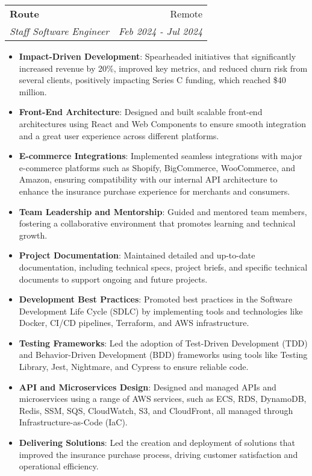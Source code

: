 \documentclass[letterpaper,11pt]{article}
\makeatletter
\newcommand{\resumeItem}[2]{
  \item\small{
    \textbf{#1}{: #2 \vspace{-2pt}}
  }
}
\newcommand{\resumeSubheading}[4]{
  \vspace{-1pt}\item
    \begin{tabular*}{0.97\textwidth}[t]{l@{\extracolsep{\fill}}r}
      \textbf{#1} & #2 \\
      \textit{\small#3} & \textit{\small #4} \\
    \end{tabular*}\vspace{-5pt}
}
\newcommand{\resumeItemListStart}{\begin{itemize}}
\newcommand{\resumeItemListEnd}{\end{itemize}\vspace{-5pt}}
\makeatother
\begin{document}
\resumeSubheading
      {Route}{Remote}
      {Staff Software Engineer}{Feb 2024 - Jul 2024}
      \resumeItemListStart
        \resumeItem{Impact-Driven Development}
          {Spearheaded initiatives that significantly increased revenue by 20\%, improved key metrics, and reduced churn risk from several clients, positively impacting Series C funding, which reached \$40 million.}
        \resumeItem{Front-End Architecture}
          {Designed and built scalable front-end architectures using React and Web Components to ensure smooth integration and a great user experience across different platforms.}
 \resumeItem{E-commerce Integrations}
          {Implemented seamless integrations with major e-commerce platforms such as Shopify, BigCommerce, WooCommerce, and Amazon, ensuring compatibility with our internal API architecture to enhance the insurance purchase experience for merchants and consumers.}
        \resumeItem{Team Leadership and Mentorship}
          {Guided and mentored team members, fostering a collaborative environment that promotes learning and technical growth.}
        \resumeItem{Project Documentation}
          {Maintained detailed and up-to-date documentation, including technical specs, project briefs, and specific technical documents to support ongoing and future projects.}
        \resumeItem{Development Best Practices}
          {Promoted best practices in the Software Development Life Cycle (SDLC) by implementing tools and technologies like Docker, CI/CD pipelines, Terraform, and AWS infrastructure.}
        \resumeItem{Testing Frameworks}
          {Led the adoption of Test-Driven Development (TDD) and Behavior-Driven Development (BDD) frameworks using tools like Testing Library, Jest, Nightmare, and Cypress to ensure reliable code.}
        \resumeItem{API and Microservices Design}
          {Designed and managed APIs and microservices using a range of AWS services, such as ECS, RDS, DynamoDB, Redis, SSM, SQS, CloudWatch, S3, and CloudFront, all managed through Infrastructure-as-Code (IaC).}
        \resumeItem{Delivering Solutions}
          {Led the creation and deployment of solutions that improved the insurance purchase process, driving customer satisfaction and operational efficiency.}
      \resumeItemListEnd
\end{document}
